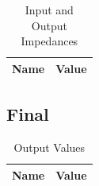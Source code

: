 \begin{table}[H]
  \centering
  \begin{tabular}{|l|r|}
     \hline    
    {\bf Name} & {\bf Value} \\ \hline   
    
  \end{tabular}
  \caption{Input and Output Impedances}
  \label{tab:osz}
\end{table}

\subsection{Final}

\begin{table}[H]
  \centering
  \begin{tabular}{|l|r|}
     \hline    
    {\bf Name} & {\bf Value} \\ \hline   
    
  \end{tabular}
  \caption{Output Values}
  \label{tab:finaltab}
\end{table}


